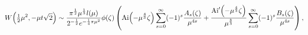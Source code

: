 \[\mathop{W\/}\nolimits\!\left(\tfrac{1}{2}\mu^{2},-\mu t\sqrt{2}\right)\sim%
\frac{\pi^{\frac{1}{2}}\mu^{\frac{1}{3}}l(\mu)}{2^{-\frac{1}{2}}e^{-\frac{1}{4%
}\pi\mu^{2}}}\phi(\zeta)\left(\mathop{\mathrm{Ai}\/}\nolimits\!\left(-\mu^{%
\frac{4}{3}}\zeta\right)\sum_{s=0}^{\infty}(-1)^{s}\frac{A_{s}(\zeta)}{\mu^{4s%
}}+\frac{\mathop{\mathrm{Ai}\/}\nolimits'\!\left(-\mu^{\frac{4}{3}}\zeta\right%
)}{\mu^{\frac{8}{3}}}\sum_{s=0}^{\infty}(-1)^{s}\frac{B_{s}(\zeta)}{\mu^{4s}}%
\right),\]